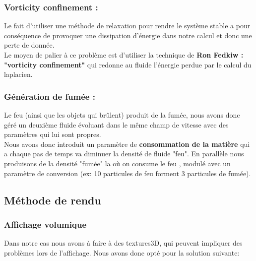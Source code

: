 \documentclass[a4paper,10pt]{article}
\begin{document}
\subsubsection{Vorticity confinement :}
Le fait d'utiliser une méthode de relaxation pour rendre le système
stable a pour conséquence de provoquer une dissipation d'énergie dans
notre calcul et donc une perte de donnée. \\

Le moyen de palier à ce problème est d'utiliser la technique de \textbf{Ron Fedkiw
: "vorticity confinement"} qui redonne au fluide l'énergie perdue par le
calcul du laplacien.

\subsubsection{Génération de fumée :}
Le feu (ainsi que les objets qui brûlent) produit de la fumée, nous avons donc géré un
deuxième fluide évoluant dans le même champ de vitesse avec des
paramètres qui lui sont propres.\\

Nous avons donc introduit un paramètre de \textbf{consommation de la
  matière} qui a chaque pas de temps va diminuer la densité de fluide
"feu". En parallèle nous produisons de la densité "fumée" la où on
consume le feu , modulé avec un paramètre de conversion (ex: 10
particules de feu forment 3 particules de fumée).


\subsection{Méthode de rendu}
\subsubsection{Affichage volumique}

Dans notre cas nous avons à faire à des textures3D, qui peuvent impliquer des problèmes lors de l'affichage. Nous avons donc opté pour la solution suivante:\\
\end{document}
